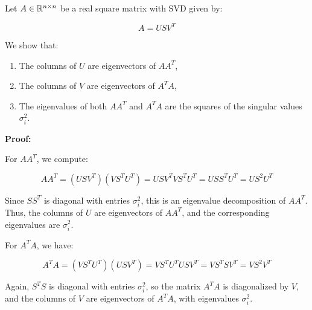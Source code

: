 Let \( A \in \mathbb{R}^{n \times n} \) be a real square matrix with SVD given by:

\[
    A = U S V^T
\]

We show that:

\begin{enumerate}

    \item The columns of \( U \) are eigenvectors of \( AA^T \),

    \item The columns of \( V \) are eigenvectors of \( A^T A \),

    \item The eigenvalues of both \( AA^T \) and \( A^T A \) are the squares of the singular values \( \sigma_i^2 \).

\end{enumerate}

\textbf{Proof:}

For \( AA^T \), we compute:

\[
    AA^T = (U S V^T)(V S^T U^T) = U S V^T V S^T U^T = U S S^T U^T = U S^2 U^T
\]

Since \( SS^T \) is diagonal with entries \( \sigma_i^2 \), this is an eigenvalue decomposition of 
\( AA^T \). Thus, the columns of \( U \) are eigenvectors of \( AA^T \), and the corresponding eigenvalues 
are \( \sigma_i^2 \).

For \( A^T A \), we have:

\[
    A^T A = (V S^T U^T)(U S V^T) = V S^T U^T U S V^T = V S^T S V^T = V S^2 V^T
\]

Again, \( S^T S \) is diagonal with entries \( \sigma_i^2 \), so the matrix \( A^T A \) is diagonalized 
by \( V \), and the columns of \( V \) are eigenvectors of \( A^T A \), with eigenvalues \( \sigma_i^2 \).

\QED


